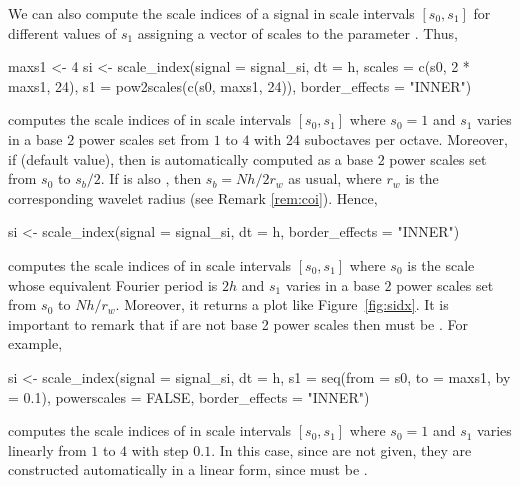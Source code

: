 We can also compute the scale indices of a signal in scale intervals $\left[ s_0,s_1\right] $ for different values of $s_1$ assigning a vector of scales to the parameter . Thus,
\begin{example}
maxs1 <- 4
si <- scale_index(signal = signal_si, dt = h, scales = c(s0, 2 * maxs1, 24),
                  s1 = pow2scales(c(s0, maxs1, 24)),
                  border_effects = "INNER")
\end{example}
computes the scale indices of  in scale intervals $\left[ s_0,s_1\right] $ where $s_0=1$ and $s_1$ varies in a base $2$ power scales set from $1$ to $4$ with 24 suboctaves per octave. Moreover, if  (default value), then  is automatically computed as a base $2$ power scales set from $s_0$ to $s_b/2$. If  is also , then $s_b=Nh/2r_w$ as usual, where $r_w$ is the corresponding wavelet radius (see Remark \ref{rem:coi}). Hence,
\begin{example}
si <- scale_index(signal = signal_si, dt = h, border_effects = "INNER")
\end{example}
computes the scale indices of  in scale intervals $\left[ s_0,s_1\right] $ where $s_0$ is the scale whose equivalent Fourier period is $2h$ and $s_1$ varies in a base $2$ power scales set from $s_0$ to $Nh/r_w$. Moreover, it returns a plot like Figure~\ref{fig:sidx}. It is important to remark that if  are not base 2 power scales then  must be . For example,
\begin{example}
si <- scale_index(signal = signal_si, dt = h,
                  s1 = seq(from = s0, to = maxs1, by = 0.1),
                  powerscales = FALSE, border_effects = "INNER")
\end{example}
computes the scale indices of  in scale intervals $\left[ s_0,s_1\right] $ where $s_0=1$ and $s_1$ varies linearly from $1$ to $4$ with step $0.1$. In this case, since  are not given, they are constructed automatically in a linear form, since  must be .

